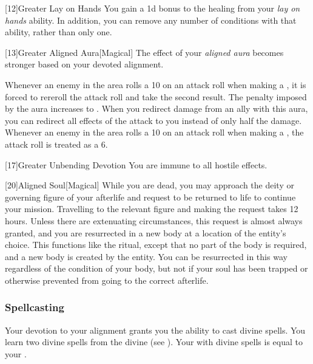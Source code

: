             [12]{Greater Lay on Hands} 
            You gain a \plus1d bonus to the healing from your \textit{lay on hands} ability.
            In addition, you can remove any number of conditions with that ability, rather than only one.

            [13]{Greater Aligned Aura}[Magical]
            The effect of your \textit{aligned aura} becomes stronger based on your devoted alignment.

             Whenever an enemy in the area rolls a 10 on an attack roll when making a , it is forced to rereroll the attack roll and take the second result.
             The penalty imposed by the aura increases to .
             When you redirect damage from an ally with this aura, you can redirect all effects of the attack to you instead of only half the damage.
             Whenever an enemy in the area rolls a 10 on an attack roll when making a , the attack roll is treated as a 6.

            [17]{Greater Unbending Devotion}
            You are immune to all hostile  effects.

            [20]{Aligned Soul}[Magical]
            While you are dead, you may approach the deity or governing figure of your afterlife and request to be returned to life to continue your mission.
            Travelling to the relevant figure and making the request takes 12 hours.
            Unless there are extenuating circumstances, this request is almost always granted, and you are resurrected in a new body at a location of the entity's choice.
            This functions like the  ritual, except that no part of the body is required, and a new body is created by the entity.
            You can be resurrected in this way regardless of the condition of your body, but not if your soul has been trapped or otherwise prevented from going to the correct afterlife.

        \subsubsection{Spellcasting}

            Your devotion to your alignment grants you the ability to cast divine spells.
            You learn two divine spells from the divine  (see ).
            Your  with divine spells is equal to your .

